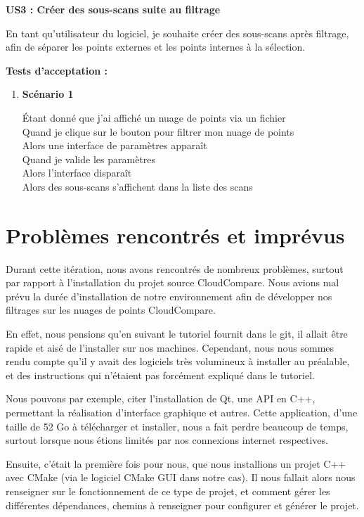 \documentclass[12pt,titlepage,french]{article}
\begin{document}
\textbf{\og US3 : Créer des sous-scans suite au filtrage\fg{}}

En tant qu'utilisateur du logiciel, je souhaite créer des sous-scans après filtrage, afin de séparer les points externes et les points internes à la sélection.

\textbf{Tests d'acceptation :}
\begin{enumerate}

    \item \textbf{Scénario 1}

Étant donné que j'ai affiché un nuage de points via un fichier\\
Quand je clique sur le bouton pour filtrer mon nuage de points\\
Alors une interface de paramètres apparaît\\
Quand je valide les paramètres\\
Alors l'interface disparaît\\
Alors des sous-scans s'affichent dans la liste des scans
\end{enumerate}

\section{Problèmes rencontrés et imprévus}

Durant cette itération, nous avons rencontrés de nombreux problèmes, surtout par rapport à l'installation du projet source CloudCompare. Nous avions mal prévu la durée d'installation de notre environnement afin de développer nos filtrages sur les nuages de points CloudCompare.

En effet, nous pensions qu'en suivant le tutoriel fournit dans le git, il allait être rapide et aisé de l'installer sur nos machines. Cependant, nous nous sommes rendu compte qu'il y avait des logiciels très volumineux à installer au préalable, et des instructions qui n'étaient pas forcément expliqué dans le tutoriel.

Nous pouvons par exemple, citer l'installation de Qt, une API en C++, permettant la réalisation d'interface graphique et autres. Cette application, d'une taille de 52 Go à télécharger et installer, nous a fait perdre beaucoup de temps, surtout lorsque nous étions limités par nos connexions internet respectives.

Ensuite, c'était la première fois pour nous, que nous installions un projet C++ avec CMake (via le logiciel CMake GUI dans notre cas). Il nous fallait alors nous renseigner sur le fonctionnement de ce type de projet, et comment gérer les différentes dépendances, chemins à renseigner pour configurer et générer le projet.
\end{document}
